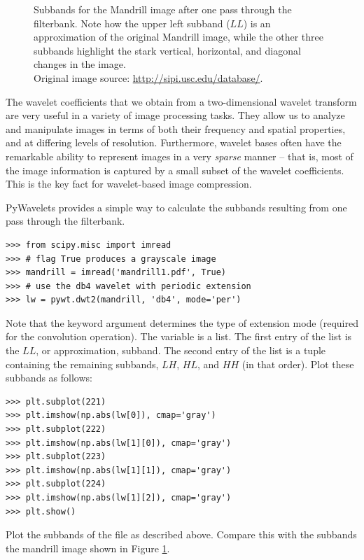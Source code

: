\begin{figure}
\begin{subfigure}{0.4\textwidth}
       \end{subfigure}
    \caption{Subbands for the Mandrill image after one pass through the filterbank.
    Note how the upper left subband ($LL$) is an approximation of the original Mandrill image, while the other
    three subbands highlight the stark vertical, horizontal, and diagonal changes in the image.\\
    Original image source: \url{http://sipi.usc.edu/database/}.}
    \label{fig:dwt2D}
\end{figure}
The wavelet coefficients that we obtain from a two-dimensional wavelet transform are very useful in a variety of image processing tasks.
They allow us to analyze and manipulate images in terms of both their
frequency and spatial properties, and at differing levels of resolution.
Furthermore, wavelet bases often have the remarkable ability to represent
images in a very \textit{sparse} manner -- that is, most of the image
information is captured by a small subset of the wavelet coefficients.
This is the key fact for wavelet-based image compression.

PyWavelets provides a simple way to calculate the subbands resulting from one pass through the filterbank.
\begin{lstlisting}
>>> from scipy.misc import imread
>>> # flag True produces a grayscale image
>>> mandrill = imread('mandrill1.pdf', True)
>>> # use the db4 wavelet with periodic extension
>>> lw = pywt.dwt2(mandrill, 'db4', mode='per')
\end{lstlisting}
Note that the  keyword argument determines the type of extension mode (required for the convolution
operation).
The variable  is a list. The first entry of the list is the $LL$, or approximation, subband.
The second entry of the list is a tuple containing the remaining subbands, $LH$, $HL$, and $HH$ (in that order).
Plot these subbands as follows:
\begin{lstlisting}
>>> plt.subplot(221)
>>> plt.imshow(np.abs(lw[0]), cmap='gray')
>>> plt.subplot(222)
>>> plt.imshow(np.abs(lw[1][0]), cmap='gray')
>>> plt.subplot(223)
>>> plt.imshow(np.abs(lw[1][1]), cmap='gray')
>>> plt.subplot(224)
>>> plt.imshow(np.abs(lw[1][2]), cmap='gray')
>>> plt.show()
\end{lstlisting}

\begin{problem}
Plot the subbands of the file  as described above.
Compare this with the subbands the mandrill image shown in Figure \ref{fig:dwt2D}.
\end{problem}

